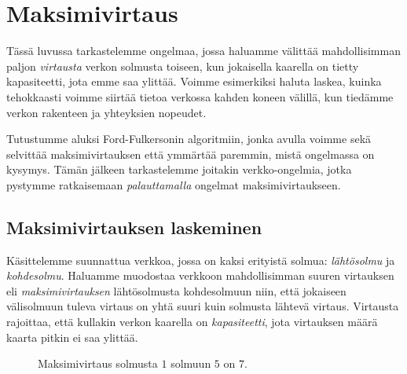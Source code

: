 \chapter{Maksimivirtaus}

Tässä luvussa tarkastelemme ongelmaa,
jossa haluamme välittää mahdollisimman paljon
\emph{virtausta} verkon solmusta toiseen,
kun jokaisella kaarella on tietty kapasiteetti,
jota emme saa ylittää.
Voimme esimerkiksi haluta laskea, kuinka tehokkaasti
voimme siirtää tietoa verkossa kahden koneen välillä,
kun tiedämme verkon rakenteen ja yhteyksien nopeudet.

Tutustumme aluksi Ford-Fulkersonin algoritmiin,
jonka avulla voimme sekä selvittää maksimivirtauksen
että ymmärtää paremmin, mistä ongelmassa on kysymys.
Tämän jälkeen tarkastelemme joitakin verkko-ongelmia,
jotka pystymme ratkaisemaan \emph{palauttamalla}
ongelmat maksimivirtaukseen.

\section{Maksimivirtauksen laskeminen}

Käsittelemme suunnattua verkkoa,
jossa on kaksi erityistä solmua:
\emph{lähtösolmu} ja \emph{kohdesolmu}.
Haluamme muodostaa verkkoon mahdollisimman
suuren virtauksen eli \emph{maksimivirtauksen}
lähtösolmusta kohdesolmuun niin, että
jokaiseen välisolmuun tuleva virtaus on
yhtä suuri kuin solmusta lähtevä virtaus.
Virtausta rajoittaa, että kullakin verkon kaarella on
\emph{kapasiteetti}, jota virtauksen
määrä kaarta pitkin ei saa ylittää.

\begin{figure}
\center
\begin{center}
\end{center}
\caption{Maksimivirtaus solmusta $1$ solmuun $5$ on $7$.}
\label{fig:makvir}
\end{figure}

